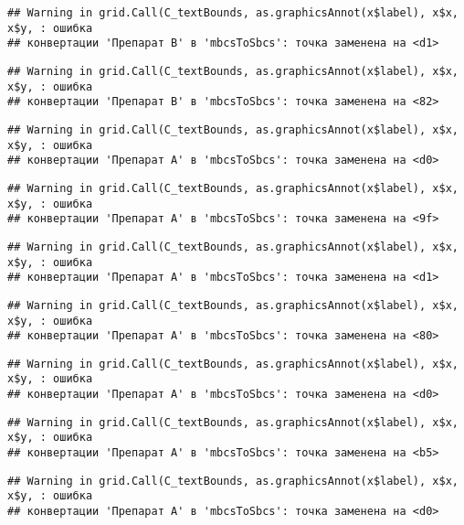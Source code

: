 \documentclass[
]{article}
\begin{document}
\begin{verbatim}
## Warning in grid.Call(C_textBounds, as.graphicsAnnot(x$label), x$x, x$y, : ошибка
## конвертации 'Препарат B' в 'mbcsToSbcs': точка заменена на <d1>
\end{verbatim}

\begin{verbatim}
## Warning in grid.Call(C_textBounds, as.graphicsAnnot(x$label), x$x, x$y, : ошибка
## конвертации 'Препарат B' в 'mbcsToSbcs': точка заменена на <82>
\end{verbatim}

\begin{verbatim}
## Warning in grid.Call(C_textBounds, as.graphicsAnnot(x$label), x$x, x$y, : ошибка
## конвертации 'Препарат A' в 'mbcsToSbcs': точка заменена на <d0>
\end{verbatim}

\begin{verbatim}
## Warning in grid.Call(C_textBounds, as.graphicsAnnot(x$label), x$x, x$y, : ошибка
## конвертации 'Препарат A' в 'mbcsToSbcs': точка заменена на <9f>
\end{verbatim}

\begin{verbatim}
## Warning in grid.Call(C_textBounds, as.graphicsAnnot(x$label), x$x, x$y, : ошибка
## конвертации 'Препарат A' в 'mbcsToSbcs': точка заменена на <d1>
\end{verbatim}

\begin{verbatim}
## Warning in grid.Call(C_textBounds, as.graphicsAnnot(x$label), x$x, x$y, : ошибка
## конвертации 'Препарат A' в 'mbcsToSbcs': точка заменена на <80>
\end{verbatim}

\begin{verbatim}
## Warning in grid.Call(C_textBounds, as.graphicsAnnot(x$label), x$x, x$y, : ошибка
## конвертации 'Препарат A' в 'mbcsToSbcs': точка заменена на <d0>
\end{verbatim}

\begin{verbatim}
## Warning in grid.Call(C_textBounds, as.graphicsAnnot(x$label), x$x, x$y, : ошибка
## конвертации 'Препарат A' в 'mbcsToSbcs': точка заменена на <b5>
\end{verbatim}

\begin{verbatim}
## Warning in grid.Call(C_textBounds, as.graphicsAnnot(x$label), x$x, x$y, : ошибка
## конвертации 'Препарат A' в 'mbcsToSbcs': точка заменена на <d0>
\end{verbatim}
\end{document}
